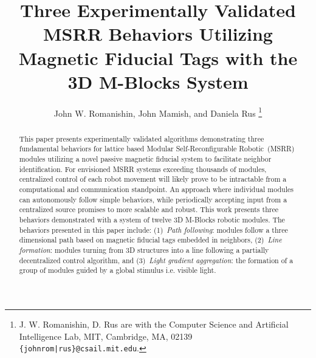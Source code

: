 \documentclass[letterpaper, 10 pt, conference]{ieeeconf}
\title{Three Experimentally Validated MSRR Behaviors Utilizing Magnetic Fiducial Tags with the 3D M-Blocks System}
\author{John W. Romanishin, John Mamish, and Daniela Rus
  \thanks{J. W. Romanishin, D. Rus are with the Computer Science
    and Artificial Intelligence Lab, MIT, Cambridge, MA, 02139
    {\tt\small \{johnrom|rus\}@csail.mit.edu}.}
}
\begin{document}
	
\newcommand{\tagName}{MFTag}
\newcommand{\TagName}{MFTag}
\newcommand{\tagNamePlural}{MFTags}
\newcommand{\TagNamePlural}{MFTags}


\captionsetup[figure]{labelfont=small, textfont=small}
\captionsetup[table]{labelfont=small, textfont=small}

\maketitle
\thispagestyle{empty}
\pagestyle{empty}

\begin{abstract}

This paper presents experimentally validated algorithms demonstrating three fundamental behaviors for lattice based Modular Self-Reconfigurable Robotic~(MSRR) modules utilizing a novel passive magnetic fiducial system to facilitate neighbor identification. For envisioned MSRR systems exceeding thousands of modules, centralized control of each robot movement will likely prove to be intractable from a computational and communication standpoint. An approach where individual modules can autonomously follow simple behaviors, while periodically accepting input from a centralized source promises to more scalable and robust. This work presents three behaviors demonstrated with a system of twelve 3D M-Blocks robotic modules. The behaviors presented in this paper include: (1)~\textit{Path following}: modules follow a three dimensional path based on magnetic fiducial tags embedded in neighbors, (2)~\textit{Line formation}: modules turning from 3D structures into a line following a partially decentralized control algorithm, and (3)~\textit{Light gradient aggregation}: the formation of a group of modules guided by a global stimulus i.e. visible light.

\end{abstract}


\end{document}
